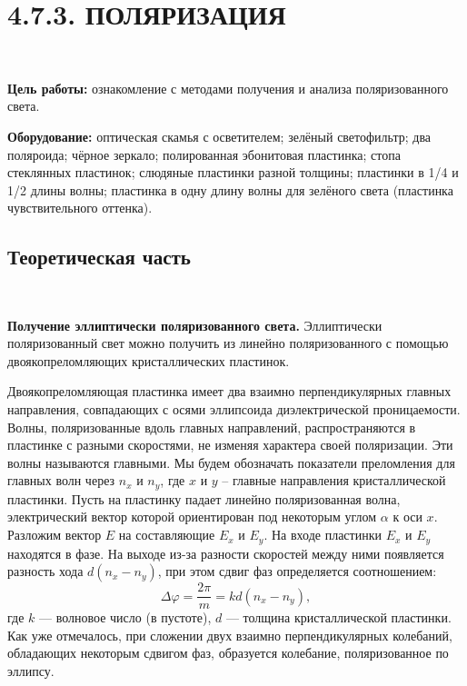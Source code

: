 \documentclass[12pt]{article}
\begin{document}
    \section*{4.7.3. ПОЛЯРИЗАЦИЯ}
    \ \par
    \textbf{Цель работы:} ознакомление с методами получения и анализа поляризованного света.

    \textbf{Оборудование:} оптическая скамья с осветителем; зелёный светофильтр; два поляроида; чёрное зеркало;
    полированная эбонитовая пластинка; стопа стеклянных пластинок; слюдяные пластинки разной толщины;
    пластинки в 1/4 и 1/2 длины волны; пластинка в одну длину волны для зелёного света
    (пластинка чувствительного оттенка).


    \subsection*{Теоретическая часть}
    \ \par
    \textbf{Получение эллиптически поляризованного света.}
    Эллиптически поляризованный свет можно получить из линейно поляризованного с
    помощью двоякопреломляющих кристаллических пластинок.

    Двоякопреломляющая пластинка имеет два взаимно перпендикулярных главных направления,
    совпадающих с осями эллипсоида диэлектрической проницаемости.
    Волны, поляризованные вдоль главных направлений, распространяются в пластинке с разными
    скоростями, не изменяя характера своей поляризации.
    Эти волны называются главными.
    Мы будем обозначать показатели преломления для главных волн через $n_x$ и $n_y$,
    где $x$ и $y$ -- главные направления кристаллической пластинки.
    Пусть на пластинку падает линейно поляризованная волна,
    электрический вектор которой ориентирован под некоторым углом $\alpha$ к оси $x$.
    Разложим вектор $E$ на составляющие $E_x$ и $E_y$.
    На входе пластинки $E_x$ и $E_y$ находятся в фазе.
    На выходе из-за разности скоростей между ними появляется разность хода $d(n_x − n_y)$,
    при этом сдвиг фаз определяется соотношением:
    \begin{equation}
        \Delta \varphi = \frac{2\pi}{m} = kd(n_x - n_y),
        \label{eq:1}
    \end{equation}
    где $k$ — волновое число (в пустоте), $d$ — толщина кристаллической пластинки.
    Как уже отмечалось, при сложении двух взаимно перпендикулярных колебаний,
    обладающих некоторым сдвигом фаз, образуется колебание, поляризованное по эллипсу.
\end{document}
